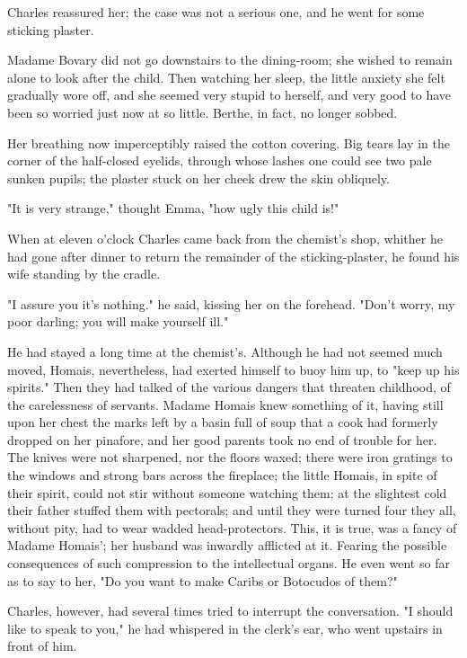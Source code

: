 \documentclass{tufte-book}
\begin{document}
Charles reassured her; the case was not a serious one, and he went for
some sticking plaster.

Madame Bovary did not go downstairs to the dining-room; she wished
to remain alone to look after the child. Then watching her sleep, the
little anxiety she felt gradually wore off, and she seemed very stupid
to herself, and very good to have been so worried just now at so little.
Berthe, in fact, no longer sobbed.

Her breathing now imperceptibly raised the cotton covering. Big tears
lay in the corner of the half-closed eyelids, through whose lashes one
could see two pale sunken pupils; the plaster stuck on her cheek drew
the skin obliquely.

"It is very strange," thought Emma, "how ugly this child is!"

When at eleven o'clock Charles came back from the chemist's shop,
whither he had gone after dinner to return the remainder of the
sticking-plaster, he found his wife standing by the cradle.

"I assure you it's nothing." he said, kissing her on the forehead.
"Don't worry, my poor darling; you will make yourself ill."

He had stayed a long time at the chemist's. Although he had not seemed
much moved, Homais, nevertheless, had exerted himself to buoy him up, to
"keep up his spirits." Then they had talked of the various dangers that
threaten childhood, of the carelessness of servants. Madame Homais knew
something of it, having still upon her chest the marks left by a basin
full of soup that a cook had formerly dropped on her pinafore, and
her good parents took no end of trouble for her. The knives were not
sharpened, nor the floors waxed; there were iron gratings to the windows
and strong bars across the fireplace; the little Homais, in spite of
their spirit, could not stir without someone watching them; at the
slightest cold their father stuffed them with pectorals; and until
they were turned four they all, without pity, had to wear wadded
head-protectors. This, it is true, was a fancy of Madame Homais'; her
husband was inwardly afflicted at it. Fearing the possible consequences
of such compression to the intellectual organs. He even went so far as
to say to her, "Do you want to make Caribs or Botocudos of them?"

Charles, however, had several times tried to interrupt the conversation.
"I should like to speak to you," he had whispered in the clerk's ear,
who went upstairs in front of him.
\end{document}
